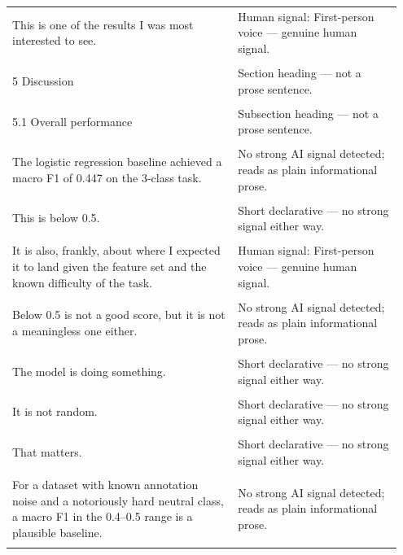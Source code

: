 \documentclass[11pt]{article}
\begin{document}
\begin{longtable}{|p{0.55\linewidth}|p{0.40\linewidth}|}
\hline
\rule{0pt}{3.5cm} & \\
\hline
This is one of the results I was most interested to see. & Human signal: First-person voice --- genuine human signal. \\[2pt]
\hline
\rule{0pt}{3.5cm} & \\
\hline
5 Discussion & Section heading --- not a prose sentence. \\[2pt]
\hline
\rule{0pt}{3.5cm} & \\
\hline
5.1 Overall performance & Subsection heading --- not a prose sentence. \\[2pt]
\hline
\rule{0pt}{3.5cm} & \\
\hline
The logistic regression baseline achieved a macro F1 of 0.447 on the 3-class task. & No strong AI signal detected; reads as plain informational prose. \\[2pt]
\hline
\rule{0pt}{3.5cm} & \\
\hline
This is below 0.5. & Short declarative --- no strong signal either way. \\[2pt]
\hline
\rule{0pt}{3.5cm} & \\
\hline
It is also, frankly, about where I expected it to land given the feature set and the known difficulty of the task. & Human signal: First-person voice --- genuine human signal. \\[2pt]
\hline
\rule{0pt}{3.5cm} & \\
\hline
Below 0.5 is not a good score, but it is not a meaningless one either. & No strong AI signal detected; reads as plain informational prose. \\[2pt]
\hline
\rule{0pt}{3.5cm} & \\
\hline
The model is doing something. & Short declarative --- no strong signal either way. \\[2pt]
\hline
\rule{0pt}{3.5cm} & \\
\hline
It is not random. & Short declarative --- no strong signal either way. \\[2pt]
\hline
\rule{0pt}{3.5cm} & \\
\hline
That matters. & Short declarative --- no strong signal either way. \\[2pt]
\hline
\rule{0pt}{3.5cm} & \\
\hline
For a dataset with known annotation noise and a notoriously hard neutral class, a macro F1 in the 0.4--0.5 range is a plausible baseline. & No strong AI signal detected; reads as plain informational prose. \\[2pt]
\hline
\rule{0pt}{3.5cm} & \\

\end{longtable}
\end{document}
